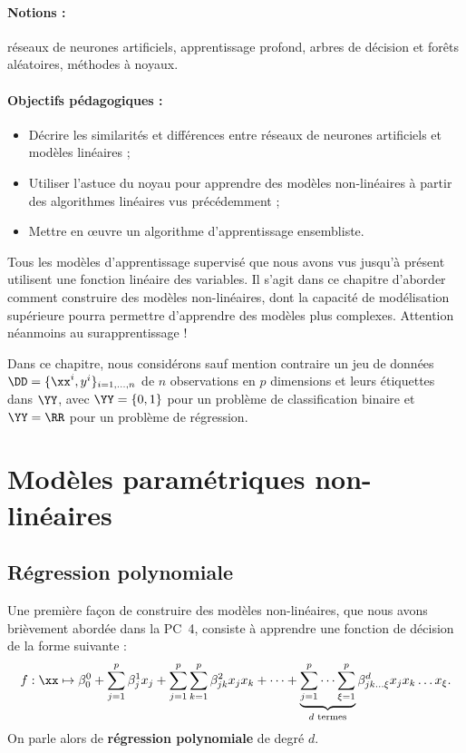 \label{chap:nonlin}


\paragraph{Notions :} réseaux de neurones artificiels, apprentissage profond,
arbres de décision et forêts aléatoires, méthodes à noyaux.
\paragraph{Objectifs pédagogiques :} 
\begin{itemize}      
  \setlength{\itemsep}{3pt}
\item Décrire les similarités et différences entre réseaux de neurones artificiels et modèles linéaires ; 
\item Utiliser l'astuce du noyau pour apprendre des modèles non-linéaires à
  partir des algorithmes linéaires vus précédemment ;
\item Mettre en \oe{}uvre un algorithme d'apprentissage ensembliste.
\end{itemize}

Tous les modèles d'apprentissage supervisé que nous avons vus jusqu'à présent
utilisent une fonction linéaire des variables. Il s'agit dans ce chapitre
d'aborder comment construire des modèles non-linéaires, dont la capacité de
modélisation supérieure pourra permettre d'apprendre des modèles plus complexes. Attention néanmoins au surapprentissage !

Dans ce chapitre, nous considérons sauf mention contraire un jeu de données
$\DD = \{\xx^i, y^i\}_{i=1, \dots, n}$ de $n$ observations en $p$ dimensions et
leurs étiquettes dans $\YY$, avec $\YY= \{0, 1\}$ pour un problème de
classification binaire et $\YY = \RR$ pour un problème de régression.

\section{Modèles paramétriques non-linéaires}

\subsection{Régression polynomiale}
\label{sec:polynomial_reg}
Une première façon de construire des modèles non-linéaires, que nous avons
brièvement abordée dans la PC~4, consiste à apprendre une fonction de
décision de la forme suivante :
\begin{equation}
  \label{eq:polynomial_decision}
  f: \xx \mapsto \beta^0_0 + \sum_{j=1}^p \beta^1_{j} x_j + 
  \sum_{j=1}^p \sum_{k=1}^p \beta^2_{jk} x_j x_k + \dots +
  \underbrace{\sum_{j=1}^p \dots \sum_{\xi=1}^p}_{d \text{ termes}} \beta^d_{jk\dots\xi} x_j x_k \dots x_{\xi}.
\end{equation}
On parle alors de \textbf{régression polynomiale} de degré $d$.

